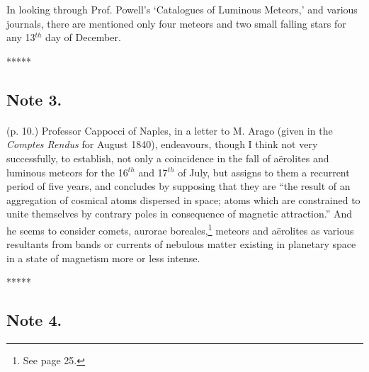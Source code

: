 \documentclass[a4paper, 12pt, oneside]{article}
\begin{document}
In looking through Prof. Powell's `Catalogues of Luminous Meteors,' and various journals, there are mentioned only four meteors and two small falling stars for any 13$^{th}$ day of December.

\centerline{*\hspace{15mm}*\hspace{15mm}*\hspace{15mm}*\hspace{15mm}*}
\bigskip

\subsection{Note 3.}
\paragraph{}
(p. 10.) Professor Cappocci of Naples, in a letter to M. Arago (given in the \emph{Comptes Rendus} for August 1840), endeavours, though I think not very successfully, to establish, not only a coincidence in the fall of aërolites and luminous meteors for the 16$^{th}$ and 17$^{th}$ of July, but assigns to them a recurrent period of five years, and concludes by supposing that they are ``the result of an aggregation of cosmical atoms dispersed in space; atoms which are constrained to unite themselves by contrary poles in consequence of magnetic attraction.'' And he seems to consider comets, aurorae boreales,\footnote{See page 25.} meteors and aërolites as various resultants from bands or currents of nebulous matter existing in planetary space in a state of magnetism more or less intense.

\centerline{*\hspace{15mm}*\hspace{15mm}*\hspace{15mm}*\hspace{15mm}*}
\bigskip

\subsection{Note 4.}
\end{document}
